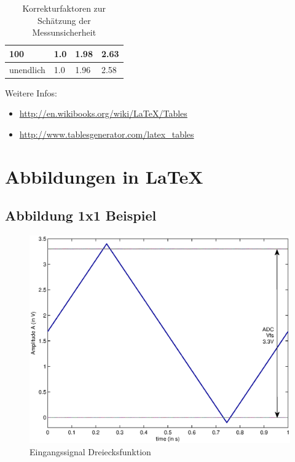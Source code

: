 \documentclass[TGAI_Laborbericht.tex]{subfiles}
\begin{document}
\begin{table}[H]
\begin{tabular}{|l|l|l|l|}
100                                                            & 1.0                                                                 & 1.98                                                             & 2.63                                                             \\ \hline
unendlich                                                      & 1.0                                                                 & 1.96                                                             & 2.58                                                             \\ \hline
\end{tabular}
\caption{Korrekturfaktoren zur Schätzung der Messunsicherheit\cite[S.10]{Franz2015b}}
\label{tab:KORREKTURFAKTUREN}
\end{table}

Weitere Infos:
\begin{itemize}
  \item \href{http://en.wikibooks.org/wiki/LaTeX/Tables}{http://en.wikibooks.org/wiki/LaTeX/Tables}
  \item \href{http://www.tablesgenerator.com/latex\_tables}{http://www.tablesgenerator.com/latex\_tables}
\end{itemize}

\newpage

\section{Abbildungen in \LaTeX}

\subsection{Abbildung 1x1 Beispiel}
\begin{figure}[H]
	\centering\small
	\includegraphics[width=\textwidth]{media/matlab/HISTOGRAM/ramp_fkt_samples_5000.eps}
	\caption{Eingangssignal Dreiecksfunktion}
	\label{fig:GRUNDL_RAMP_SIN_HIST_1X1}
\end{figure}
~
\end{document}
